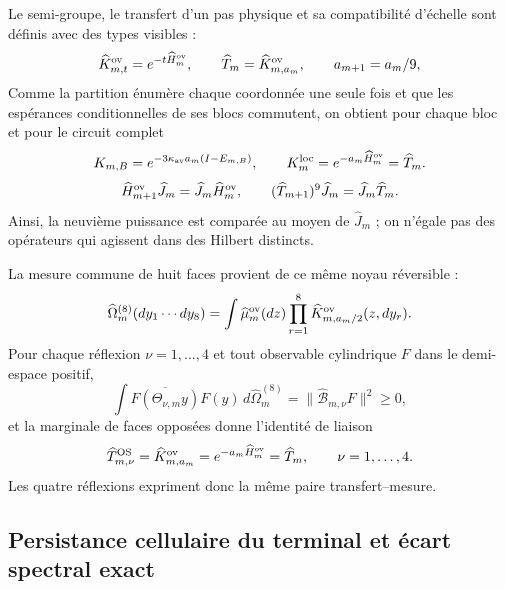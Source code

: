 Le semi-groupe, le transfert d'un pas physique et sa compatibilité d'échelle sont définis avec des types visibles :
\begin{equation}\label{eq:realizaciones-ym-semigrupo}
 \widehat K_{m,t}^{\rm ov}=e^{-t\widehat H_m^{\rm ov}},
 \qquad
 \widehat T_m=\widehat K_{m,a_m}^{\rm ov},
 \qquad a_{m+1}=a_m/9,
\end{equation}
Comme la partition énumère chaque coordonnée une seule fois et que les espérances
conditionnelles de ses blocs commutent, on obtient pour chaque bloc et pour le circuit
complet
\begin{equation}\label{eq:realizaciones-ym-circuito-semigrupo}
 K_{m,B}=e^{-3\kappa_{\rm av}a_m(I-E_{m,B})},
 \qquad
 K_m^{\rm loc}=e^{-a_m\widehat H_m^{\rm ov}}=\widehat T_m.
\end{equation}
\begin{equation}\label{eq:realizaciones-ym-semigrupo-entrelazado}
 \widehat H_{m+1}^{\rm ov}\widehat J_m
 =\widehat J_m\widehat H_m^{\rm ov},
 \qquad
 (\widehat T_{m+1})^9\widehat J_m
 =\widehat J_m\widehat T_m.
\end{equation}
Ainsi, la neuvième puissance est comparée au moyen de \(\widehat J_m\) ; on n’égale pas
des opérateurs qui agissent dans des Hilbert distincts.

La mesure commune de huit faces provient de ce même noyau réversible :
\begin{equation}\label{eq:realizaciones-ym-medida-ocho}
 \widehat\Omega_m^{(8)}(dy_1\cdots dy_8)
 =\int\widehat\mu_m^{\rm ov}(dz)
   \prod_{r=1}^{8}
   \widehat K_{m,a_m/2}^{\rm ov}(z,dy_r).
\end{equation}
Pour chaque réflexion \(\nu=1,\ldots,4\) et tout observable cylindrique \(F\)
dans le demi-espace positif,
\begin{equation}\label{eq:realizaciones-ym-os}
 \int\overline{F(\Theta_{\nu,m}y)}F(y)\,
 d\widehat\Omega_m^{(8)}
 =\|\widehat{\mathcal B}_{m,\nu}F\|^2\geq0,
\end{equation}
et la marginale de faces opposées donne l'identité de liaison
\begin{equation}\label{eq:realizaciones-ym-os-transferencia}
 \widehat T_{m,\nu}^{\rm OS}
 =\widehat K_{m,a_m}^{\rm ov}
 =e^{-a_m\widehat H_m^{\rm ov}}
 =\widehat T_m,
 \qquad \nu=1,\ldots,4.
\end{equation}
Les quatre réflexions expriment donc la même paire transfert--mesure.

\subsection*{Persistance cellulaire du terminal et écart spectral exact}

